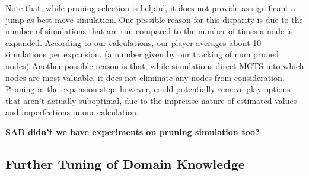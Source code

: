 \documentclass[letterpaper]{article}
\begin{document}
Note that, while pruning selection is helpful, it does not provide as significant a jump as best-move simulation. One possible reason for this disparity is due to the number of simulations that are run compared to the number of times a node is expanded. According to our calculations, our player averages about 10 simulations per expansion. (a number given by our tracking of num pruned nodes)  Another possible reason is that, while simulations direct MCTS into which nodes are most valuable, it does not eliminate any nodes from consideration. Pruning in the expansion step, however, could potentially remove play options that aren’t actually suboptimal, due to the imprecise nature of estimated values and imperfections in our calculation.

{\bf SAB didn't we have experiments on pruning simulation too?}

\subsection{Further Tuning of Domain Knowledge}


\end{document}
